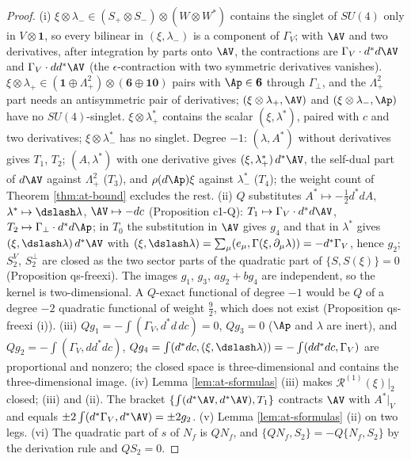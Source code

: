 \begin{proof}
(i) $\xi\otimes\lambda_-\in(S_+\otimes S_-)\otimes(W\otimes W^*)$ contains the singlet of $SU(4)$ only in $V\otimes\mathbf 1$, so every bilinear in $(\xi,\lambda_-)$ is a component of $\Gamma_V$; with $\AV$ and two derivatives, after integration by parts onto $\AV$, the contractions are $\Gamma_V\cdot d^*d\AV$ and $\Gamma_V\cdot dd^*\AV$ (the $\epsilon$-contraction with two symmetric derivatives vanishes). $\xi\otimes\lambda_+\in(\mathbf 1\oplus\Lambda^2_+)\otimes(\mathbf 6\oplus\mathbf{10})$ pairs with $\Ap\in\mathbf 6$ through $\Gamma_\perp$, and the $\Lambda^2_+$ part needs an antisymmetric pair of derivatives; $(\xi\otimes\lambda_+,\AV)$ and $(\xi\otimes\lambda_-,\Ap)$ have no $SU(4)$-singlet. $\xi\otimes\lambda^*_+$ contains the scalar $(\xi,\lambda^*)$, paired with $c$ and two derivatives; $\xi\otimes\lambda^*_-$ has no singlet. Degree $-1$: $(\lambda,A^*)$ without derivatives gives $T_1$, $T_2$; $(A,\lambda^*)$ with one derivative gives $(\xi,\lambda^*_+)\,d^*\AV$, the self-dual part of $d\AV$ against $\Lambda^2_+$ ($T_3$), and $\rho(d\Ap)\xi$ against $\lambda^*_-$ ($T_4$); the weight count of Theorem \ref{thm:at-bound} excludes the rest. (ii) $Q$ substitutes $A^*\mapsto-\tfrac12d^*dA$, $\lambda^*\mapsto\dslash\lambda$, $\AV\mapsto-dc$ (Proposition c1-Q): $T_1\mapsto\Gamma_V\cdot d^*d\AV$, $T_2\mapsto\Gamma_\perp\cdot d^*d\Ap$; in $T_0$ the substitution in $\AV$ gives $g_4$ and that in $\lambda^*$ gives $(\xi,\dslash\lambda)\,d^*\AV$ with $(\xi,\dslash\lambda)=\sum_\mu(e_\mu,\Gamma(\xi,\partial_\mu\lambda))=-d^*\Gamma_V$, hence $g_2$; $S^V_2$, $S^\perp_2$ are closed as the two sector parts of the quadratic part of $\{S,S(\xi)\}=0$ (Proposition qs-freexi). The images $g_1$, $g_3$, $ag_2+bg_4$ are independent, so the kernel is two-dimensional. A $Q$-exact functional of degree $-1$ would be $Q$ of a degree $-2$ quadratic functional of weight $\tfrac92$, which does not exist (Proposition qs-freexi (i)). (iii) $Qg_1=-\int(\Gamma_V,d^*d\,dc)=0$, $Qg_3=0$ ($\Ap$ and $\lambda$ are inert), and $Qg_2=-\int(\Gamma_V,dd^*dc)$, $Qg_4=\int(d^*dc,(\xi,\dslash\lambda))=-\int(dd^*dc,\Gamma_V)$ are proportional and nonzero; the closed space is three-dimensional and contains the three-dimensional image. (iv) Lemma \ref{lem:at-sformulas} (iii) makes $\mathcal R^{(1)}(\xi)|_2$ closed; (iii) and (ii). The bracket $\{\int(d^*\AV,d^*\AV),T_1\}$ contracts $\AV$ with $A^*|_V$ and equals $\pm2\int(d^*\Gamma_V,d^*\AV)=\pm2g_2$. (v) Lemma \ref{lem:at-sformulas} (ii) on two legs. (vi) The quadratic part of $s$ of $N_f$ is $QN_f$, and $\{QN_f,S_2\}=-Q\{N_f,S_2\}$ by the derivation rule and $QS_2=0$.
\end{proof}

